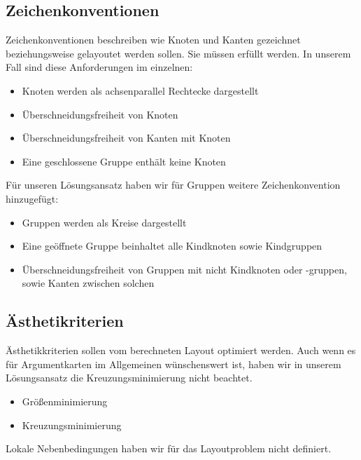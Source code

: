 \subsection{Zeichenkonventionen}
Zeichenkonventionen beschreiben wie Knoten und Kanten gezeichnet beziehungsweise gelayoutet werden sollen. Sie müssen erfüllt werden.
In unserem Fall sind diese Anforderungen im einzelnen:

\begin{itemize}
\item Knoten werden als achsenparallel Rechtecke dargestellt
\item Überschneidungsfreiheit von Knoten
\item Überschneidungsfreiheit von Kanten mit Knoten
\item Eine geschlossene Gruppe enthält keine Knoten
\end{itemize}

Für unseren Lösungsansatz haben wir für Gruppen weitere Zeichenkonvention hinzugefügt:
\begin{itemize}
\item Gruppen werden als Kreise dargestellt
\item Eine geöffnete Gruppe beinhaltet alle Kindknoten sowie Kindgruppen
\item Überschneidungsfreiheit von Gruppen mit nicht Kindknoten oder -gruppen, sowie Kanten zwischen solchen
\end{itemize}

\subsection{Ästhetikriterien}
Ästhetikkriterien sollen vom berechneten Layout optimiert werden. 
Auch wenn es für Argumentkarten im Allgemeinen wünschenswert ist, haben wir in unserem Lösungsansatz die Kreuzungsminimierung nicht beachtet.
\begin{itemize}
\item Größenminimierung 
\item Kreuzungsminimierung
\end{itemize}

Lokale Nebenbedingungen haben wir für das Layoutproblem nicht definiert.


